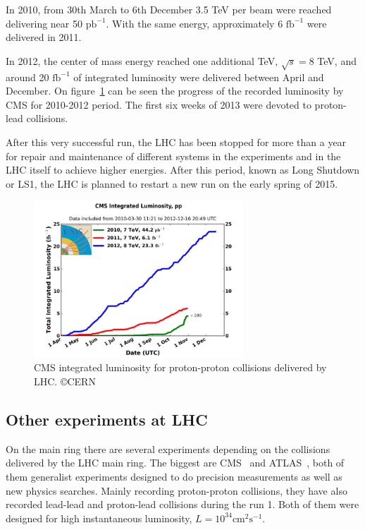 In 2010, from 30th March to 6th December 3.5 TeV per beam were reached delivering near 50 $\text{pb}^{-1}$. With the same energy, approximately 6 $\text{fb}^{-1}$ were delivered in 2011. 

In 2012, the center of mass energy reached one additional TeV, $\sqrt{s}=8$ TeV, and around 20 $\text{fb}^{-1}$ of integrated luminosity were delivered between April and December. On figure~\ref{fig:CMSlumi} can be seen the progress of the recorded luminosity by CMS for 2010-2012 period. The first six weeks of 2013 were devoted to proton-lead collisions.

After this very successful run, the LHC has been stopped for more than a year for repair and maintenance of different systems in the experiments and in the LHC itself to achieve higher energies. After this period, known as Long Shutdown  or LS1, the LHC is planned to restart a new run on the early spring of 2015.

\begin{figure}[!Hhtbp]
  \begin{center}
    \includegraphics[width=0.7\textwidth]{figs/cms-int-10to12.jpg}
    \caption{CMS integrated luminosity for proton-proton collisions delivered by LHC. \copyright CERN}
    \label{fig:CMSlumi}
  \end{center}
\end{figure}

\subsection{Other experiments at LHC}
\label{sec:expers}

On the main ring there are several experiments depending on the collisions delivered by the LHC main ring. The biggest are CMS~\cite{Bayatian:922757} and ATLAS~\cite{ATLAS:1999}, both of them generalist experiments designed to do precision measurements as well as new physics searches. Mainly recording proton-proton collisions, they have also recorded lead-lead and proton-lead collisions during the run 1. Both of them were designed for high instantaneous luminosity, $L = 10^{34}\text{cm}^{2}\text{s}^{-1}$.

